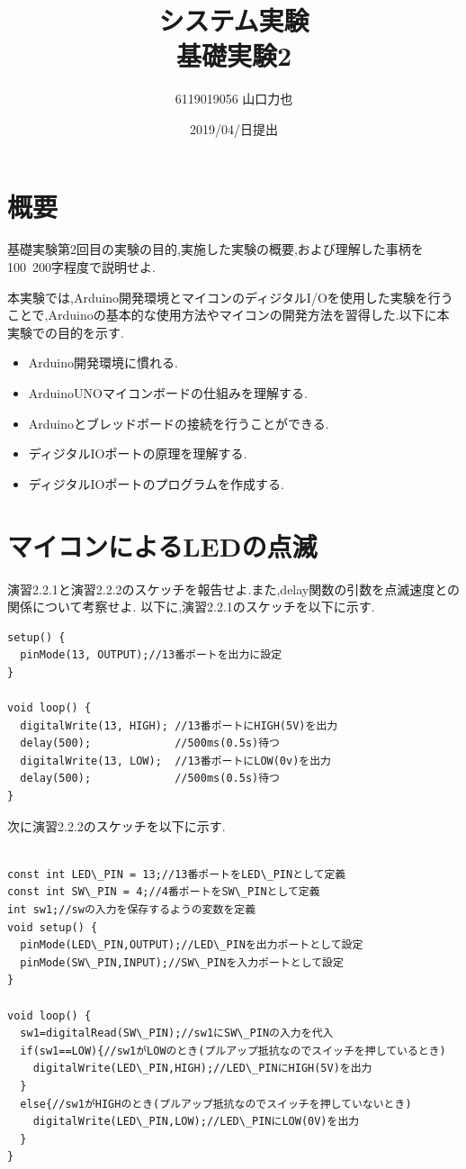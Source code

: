 \documentclass{jarticle}
\title{{システム実験}\\基礎実験2}
\author{6119019056 山口力也}
\date{2019/04/日提出}
\begin{document}
\maketitle

\section{概要}
基礎実験第2回目の実験の目的,実施した実験の概要,および理解した事柄を100~200字程度で説明せよ.

本実験では,Arduino開発環境とマイコンのディジタルI/Oを使用した実験を行うことで,Arduinoの基本的な使用方法やマイコンの開発方法を習得した.以下に本実験での目的を示す.

\begin{itemize}

\item Arduino開発環境に慣れる.
\item ArduinoUNOマイコンボードの仕組みを理解する.
\item Arduinoとブレッドボードの接続を行うことができる.
\item ディジタルIOポートの原理を理解する.
\item ディジタルIOポートのプログラムを作成する.

\end{itemize}

\section{マイコンによるLEDの点滅}
演習2.2.1と演習2.2.2のスケッチを報告せよ.また,delay関数の引数を点滅速度との関係について考察せよ.
以下に,演習2.2.1のスケッチを以下に示す.

\begin{lstlisting}
setup() {
  pinMode(13, OUTPUT);//13番ポートを出力に設定
}

void loop() {
  digitalWrite(13, HIGH); //13番ポートにHIGH(5V)を出力 
  delay(500);             //500ms(0.5s)待つ
  digitalWrite(13, LOW);  //13番ポートにLOW(0v)を出力 
  delay(500);             //500ms(0.5s)待つ 
}
\end{lstlisting}

次に演習2.2.2のスケッチを以下に示す.
\begin{lstlisting}

const int LED\_PIN = 13;//13番ポートをLED\_PINとして定義
const int SW\_PIN = 4;//4番ポートをSW\_PINとして定義
int sw1;//swの入力を保存するようの変数を定義
void setup() {
  pinMode(LED\_PIN,OUTPUT);//LED\_PINを出力ポートとして設定
  pinMode(SW\_PIN,INPUT);//SW\_PINを入力ポートとして設定
}

void loop() {
  sw1=digitalRead(SW\_PIN);//sw1にSW\_PINの入力を代入
  if(sw1==LOW){//sw1がLOWのとき(プルアップ抵抗なのでスイッチを押しているとき)
    digitalWrite(LED\_PIN,HIGH);//LED\_PINにHIGH(5V)を出力
  }
  else{//sw1がHIGHのとき(プルアップ抵抗なのでスイッチを押していないとき)
    digitalWrite(LED\_PIN,LOW);//LED\_PINにLOW(0V)を出力
  }
}

\end{lstlisting}
\end{document}
